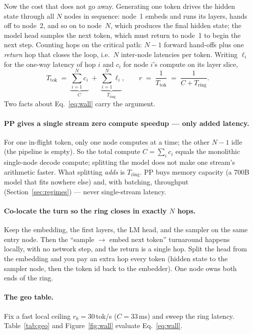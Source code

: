 \documentclass[11pt]{article}
\newcommand{\Tring}{\ensuremath{T_{\mathrm{ring}}}}
\begin{document}
Now the cost that does not go away. Generating one token drives the hidden state through all $N$
nodes in sequence: node~1 embeds and runs its layers, hands off to node~2, and so on to node~$N$,
which produces the final hidden state; the model head samples the next token, which must return to
node~1 to begin the next step. Counting hops on the critical path: $N-1$ forward hand-offs plus one
\emph{return} hop that closes the loop, i.e.\ $N$ inter-node latencies per token. Writing $\ell_i$
for the one-way latency of hop $i$ and $c_i$ for node $i$'s compute on its layer slice,
\begin{equation}
T_{\mathrm{tok}} \;=\; \underbrace{\sum_{i=1}^{N} c_i}_{\textstyle C}
\;+\; \underbrace{\sum_{i=1}^{N} \ell_i}_{\textstyle \Tring},
\qquad
r \;=\; \frac{1}{T_{\mathrm{tok}}} \;=\; \frac{1}{C + \Tring}.
\label{eq:wall}
\end{equation}
Two facts about Eq.~\eqref{eq:wall} carry the argument.

\paragraph{PP gives a single stream zero compute speedup --- only added latency.} For one in-flight
token, only one node computes at a time; the other $N-1$ idle (the pipeline is empty). So the total
compute $C=\sum_i c_i$ equals the monolithic single-node decode compute; splitting the model does
not make one stream's arithmetic faster. What splitting \emph{adds} is $\Tring$. PP buys memory
capacity (a 700B model that fits nowhere else) and, with batching, throughput
(Section~\ref{sec:regimes}) --- never single-stream latency.

\paragraph{Co-locate the turn so the ring closes in exactly $N$ hops.} Keep the embedding, the first
layers, the LM head, and the sampler on the same entry node. Then the ``sample $\to$ embed next
token'' turnaround happens locally, with no network step, and the return is a single hop. Split the
head from the embedding and you pay an extra hop every token (hidden state to the sampler node, then
the token id back to the embedder). One node owns both ends of the ring.

\paragraph{The geo table.} Fix a fast local ceiling $r_0=30$\,tok/s ($C=33$\,ms) and sweep the ring
latency. Table~\ref{tab:geo} and Figure~\ref{fig:wall} evaluate Eq.~\eqref{eq:wall}.
\end{document}
